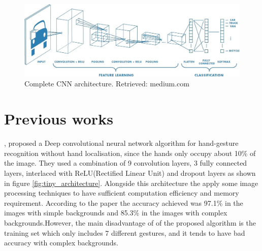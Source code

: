 \documentclass[12pt]{report}
\begin{document}
\bigbreak
\bigbreak


\begin{figure} [h]
    \centering
    \includegraphics[width=\textwidth]{./images/c_cnn.jpeg}
    
    \caption{Complete CNN architecture. Retrieved: medium.com}
    \label{fig:c_cnn}
\end{figure}



\section{Previous works}

\cite{Bao2017}, proposed a Deep convolutional neural network algorithm for hand-gesture 
recognition without hand localisation, since the hands only occupy about 10\% of 
the image. They used a combination of 9 convolution layers, 3 fully connected layers, 
interlaced with ReLU(Rectified Linear Unit) and dropout layers as shown in 
figure \ref{fig:tiny_architecture}. Alongside this architecture the apply some image 
processing techniques to have sufficient computation efficiency and memory requirement.
According to the paper the accuracy achieved was 97.1\% in the images with simple backgrounds
and 85.3\% in the images with complex backgrounds.However, the main disadvantage of of 
the proposed algorithm is the training set which only includes 7 different gestures,
and it tends to have bad accuracy with complex backgrounds.
\bigbreak
\end{document}
